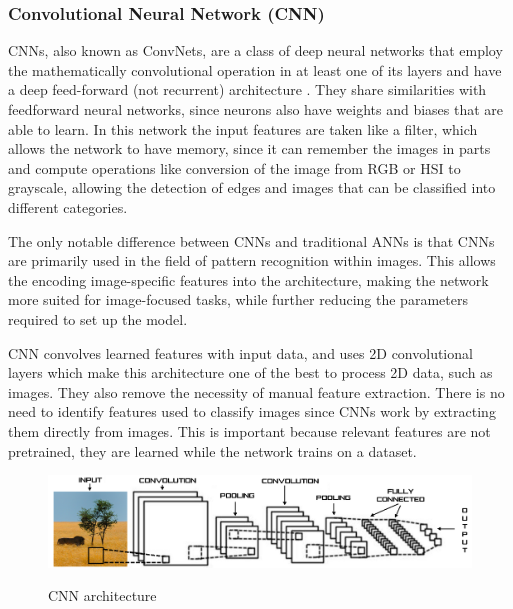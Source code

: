             \subsubsection{Convolutional Neural Network (CNN)}
            
            \par CNNs, also known as ConvNets, are a class of deep neural networks that employ the mathematically convolutional operation in at least one of its layers and have a deep feed-forward (not recurrent) architecture \cite{Ribeiro}. They share similarities with feedforward neural networks, since neurons also have weights and biases that are able to learn. In this network the input features are taken like a filter, which allows the network to have memory, since it can remember the images in parts and compute operations like conversion of the image from RGB or HSI to grayscale, allowing the detection of edges and images that can be classified into different categories. \cite{ArmaanMerchant2018}

            \par The only notable difference between CNNs and traditional ANNs is that CNNs are primarily used in the field of pattern recognition within images. This allows the encoding image-specific features into the architecture, making the network more suited for image-focused tasks, while further reducing the parameters required to set up the model. \cite{OShea2015}
            
            

            \par CNN convolves learned features with input data, and uses 2D convolutional layers which make this architecture one of the best to process 2D data, such as images. They also remove the necessity of manual feature extraction. There is no need to identify features used to classify images since CNNs work by extracting them directly from images. This is important because relevant features are not pretrained, they are learned while the network trains on a dataset. \cite{mathworks_deeplearning}

            \begin{figure}[htb]
                \centering
                \includegraphics[scale = 0.17]{Sections/2StateOfTheArt/2_images/conv.png}
                \caption{CNN architecture }  \cite{Ribeiro}
            \end{figure}


